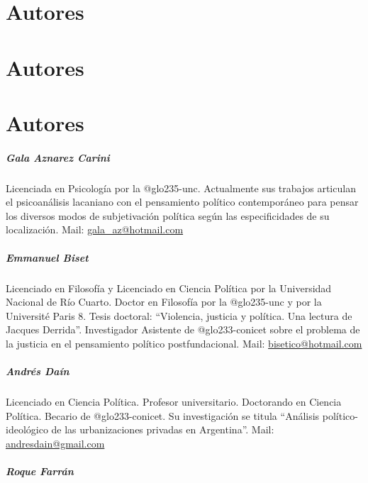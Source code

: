 \ifPDF
\chapter[Autores]{Autores}
\setcounter{PrimPag}{\theCurrentPage}
	\else
	\ifBNPDF
	\chapter[Autores]{Autores}
		\else
		\ifHTMLEPUB
		\chapter{Autores}
		\fi
	\fi
\fi

\paragraph{Gala Aznarez Carini}

Licenciada en Psicología por la \gls{@glo235-unc}. Actualmente sus trabajos articulan el psicoanálisis lacaniano con el pensamiento político contemporáneo para pensar los diversos modos de subjetivación política según las especificidades de su localización. Mail: \url{gala_az@hotmail.com}

\paragraph{Emmanuel Biset}

Licenciado en Filosofía y Licenciado en Ciencia Política por la Universidad Nacional de Río Cuarto. Doctor en Filosofía por la \gls{@glo235-unc} y por la Université Paris 8. Tesis doctoral: \enquote{Violencia, justicia y política. Una lectura de Jacques Derrida}. Investigador Asistente de \gls{@glo233-conicet} sobre el problema de la justicia en el pensamiento político postfundacional. Mail: \url{bisetico@hotmail.com}

\paragraph{Andrés Daín}

Licenciado en Ciencia Política. Profesor universitario. Doctorando en Ciencia Política. Becario de \gls{@glo233-conicet}. Su investigación se titula \enquote{Análisis político-ideológico de las urbanizaciones privadas en Argentina}. Mail: \url{andresdain@gmail.com}

\paragraph{Roque Farrán}

